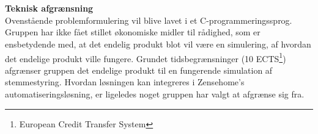 \hspace*{\fill} \\\\
{\bf Teknisk afgrænsning} \\
Ovenstående problemformulering vil blive lavet i et C-programmeringssprog. Gruppen har ikke fået stillet økonomiske midler til rådighed, som er ensbetydende med, at det endelig produkt blot vil være en simulering, af hvordan det endelige produkt ville fungere. Grundet tidsbegrænsninger (10 ECTS\footnote{European Credit Transfer System}) afgrænser gruppen det endelige produkt til en fungerende simulation af stemmestyring. Hvordan løsningen kan integreres i Zensehome's automatiseringsløsning, er ligeledes noget gruppen har valgt at afgrænse sig fra.


